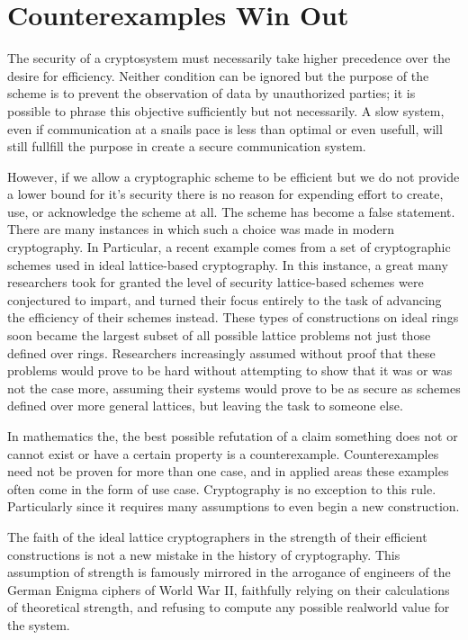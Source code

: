 \section{Counterexamples Win Out}


The security of a cryptosystem must necessarily take higher precedence over the desire for efficiency. Neither condition can be ignored but the purpose of the scheme is to prevent the observation of data by unauthorized parties; it is possible to phrase this objective sufficiently but not necessarily. A slow system, even if communication at a snails pace is less than optimal or even usefull, will still fullfill the purpose in create a secure communication system. 

However, if we allow a cryptographic scheme to be efficient but we do not provide a lower bound for it's security there is no reason for expending effort to create, use, or acknowledge the scheme at all. The scheme has become a false statement. There are many instances in which such a choice was made in modern cryptography. In Particular, a recent example comes from a set of cryptographic schemes used in ideal lattice-based cryptography. In this instance, a great many researchers took for granted the level of security lattice-based schemes were conjectured to impart, and turned their focus entirely to the task of advancing the efficiency of their schemes instead. These types of constructions on ideal rings soon became the largest subset of all possible lattice problems not just those defined over rings. Researchers increasingly assumed without proof that these problems would prove to be hard without attempting to show that it was or was not the case more, assuming their systems would prove to be as secure as schemes defined over more general lattices, but leaving the task to someone else.


In mathematics the, the best possible refutation of a claim something does not or cannot exist or have a certain property is a counterexample. Counterexamples need not be proven for more than one case, and in applied areas these examples often come in the form of use case. Cryptography is no exception to this rule. Particularly since it requires many assumptions to even begin a new construction.


The faith of the ideal lattice cryptographers in the strength of their efficient constructions is not a new mistake in the history of cryptography. This assumption of strength is famously mirrored in the arrogance of engineers of the German Enigma ciphers of World War II, faithfully relying on their calculations of theoretical strength, and refusing to compute any possible realworld value for the system.


